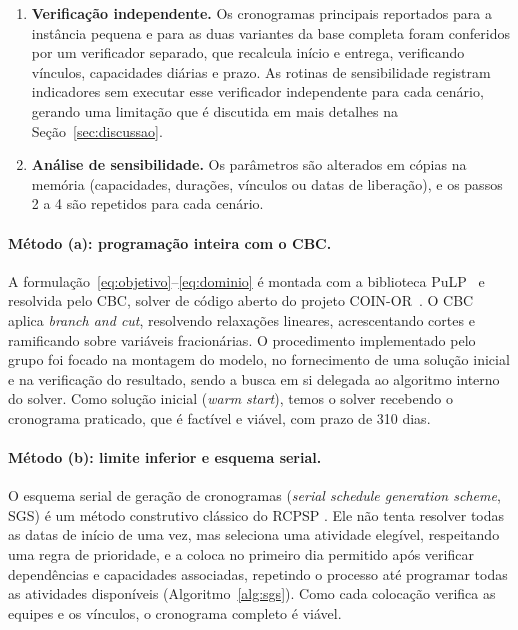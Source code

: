 \begin{enumerate}
    pergunta sobre o prazo mínimo, inclusive para a variante com liberações,
    cujo ótimo condicionado é 285 dias. Por isso, foi necessário
    complementar o solver com o SGS, que constrói soluções viáveis
    diretamente e atingiu o LB em ambas as versões.
  \item \textbf{Verificação independente.} Os cronogramas principais
    reportados para a instância pequena e para as duas variantes da base
    completa foram conferidos por um verificador separado, que recalcula
    início e entrega, verificando vínculos, capacidades diárias e prazo. As
    rotinas de sensibilidade registram indicadores sem executar esse
    verificador independente para cada cenário, gerando uma limitação que é discutida em mais detalhes
    na Seção~\ref{sec:discussao}.
  \item \textbf{Análise de sensibilidade.} Os parâmetros são alterados em
    cópias na memória (capacidades, durações, vínculos ou datas de
    liberação), e os passos 2 a 4 são repetidos para cada cenário.
\end{enumerate}

\paragraph{Método (a): programação inteira com o CBC.}
A formulação~\eqref{eq:objetivo}--\eqref{eq:dominio} é montada com a
biblioteca PuLP~\cite{mitchell2011pulp} e resolvida pelo CBC, solver de
código aberto do projeto COIN-OR~\cite{forrest2005cbc}. O CBC aplica
\emph{branch and cut}, resolvendo relaxações lineares, acrescentando cortes e
ramificando sobre variáveis fracionárias. O
procedimento implementado pelo grupo foi focado na montagem do modelo, no
fornecimento de uma solução inicial e na verificação do resultado, sendo a busca em si delegada ao algoritmo interno do solver. Como solução inicial (\emph{warm start}), temos o solver recebendo o cronograma praticado, que é factível e viável,
com prazo de 310 dias.

\paragraph{Método (b): limite inferior e esquema serial.}
O esquema serial de geração de cronogramas (\emph{serial schedule
generation scheme}, SGS) é um método construtivo clássico do RCPSP
\cite{kolisch1996}. Ele não tenta resolver todas as datas de início de
uma vez, mas seleciona uma atividade elegível, respeitando uma regra de
prioridade, e a coloca no primeiro dia permitido após verificar dependências e capacidades associadas, repetindo o processo até programar todas as atividades disponíveis (Algoritmo~\ref{alg:sgs}). Como cada colocação verifica as equipes e os
vínculos, o cronograma completo é viável.

